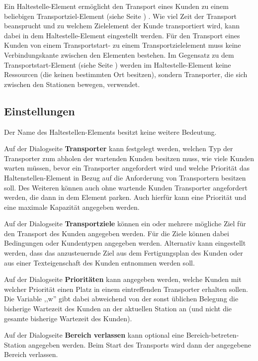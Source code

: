 Ein Haltestelle-Element ermöglicht den Transport eines Kunden zu einem beliebigen
Transportziel-Element (siehe Seite \pageref{ref:ModelElementTransportDestination}) . Wie viel
Zeit der Transport beansprucht und zu welchem Zielelement der Kunde transportiert
wird, kann dabei in dem Haltestelle-Element eingestellt werden.
Für den Transport eines Kunden von einem Transportstart- zu einem Transportzielelement
muss keine Verbindungskante zwischen den Elementen bestehen.
Im Gegensatz zu dem Transportstart-Element (siehe Seite \pageref{ref:ModelElementTransportSource}) 
werden im Haltestelle-Element keine Ressourcen (die keinen bestimmten Ort besitzen),
sondern Transporter, die sich zwischen den Stationen bewegen, verwendet.

\subsection*{Einstellungen}

Der Name des Haltestellen-Elements besitzt keine weitere Bedeutung.

Auf der Dialogseite \textbf{Transporter} kann festgelegt werden, welchen
Typ der Transporter zum abholen der wartenden Kunden besitzen muss,
wie viele Kunden warten müssen, bevor ein Transporter angefordert wird
und welche Priorität das Haltenstellen-Element in Bezug auf die
Anforderung von Transportern besitzen soll.
Des Weiteren können auch ohne wartende Kunden Transporter angefordert
werden, die dann in dem Element parken. Auch hierfür kann eine Priorität
und eine maximale Kapazität angegeben werden.

Auf der Dialogseite \textbf{Transportziele} können ein oder mehrere
mögliche Ziel für den Transport des Kunden angegeben werden. Für die Ziele können dabei
Bedingungen oder Kundentypen angegeben werden. Alternativ kann eingestellt werden, dass
das anzusteuernde Ziel aus dem Fertigungsplan des Kunden oder aus einer Texteigenschaft
des Kunden entnommen werden soll.

Auf der Dialogseite \textbf{Prioritäten} kann angegeben werden, welche
Kunden mit welcher Priorität einen Platz in einem eintreffenden
Transporter erhalten sollen.
Die Variable ,,w'' gibt dabei abweichend von der sonst üblichen Belegung die bisherige
Wartezeit des Kunden an der aktuellen Station an (und nicht die gesamte bisherige
Wartezeit des Kunden).

Auf der Dialogseite \textbf{Bereich verlassen} kann optional eine
Bereich-betreten-Station angegeben werden. Beim Start des Transports
wird dann der angegebene Bereich verlassen.


